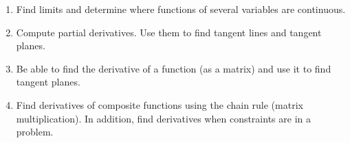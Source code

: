 
\begin{enumerate}
\item Find limits and determine where functions of several variables
  are continuous.
\item Compute partial derivatives.  Use them to find tangent lines and
  tangent planes.
\item Be able to find the derivative of a function (as a matrix) and
  use it to find tangent planes.
\item Find derivatives of composite functions using the chain rule
  (matrix multiplication). In addition, find derivatives when
  constraints are in a problem.
\end{enumerate}

